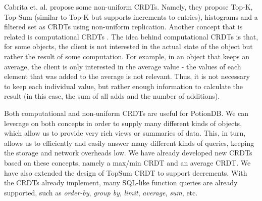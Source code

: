 Cabrita et. al. \cite{nonUniform, nonUniformThesis} propose some non-uniform CRDTs.
Namely, they propose Top-K, Top-Sum (similar to Top-K but supports increments to entries), histograms and a filtered set as CRDTs using non-uniform replication.
Another concept that is related is computational CRDTs \cite{computationalCrdt}.
The idea behind computational CRDTs is that, for some objects, the client is not interested in the actual state of the object but rather the result of some computation.
For example, in an object that keeps an average, the client is only interested in the average value - the values of each element that was added to the average is not relevant.
Thus, it is not necessary to keep each individual value, but rather enough information to calculate the result (in this case, the sum of all adds and the number of additions).

Both computational and non-uniform CRDTs are useful for PotionDB.
We can leverage on both concepts in order to supply many different kinds of objects, which allow us to provide very rich views or summaries of data. 
This, in turn, allows us to efficiently and easily answer many different kinds of queries, keeping the storage and network overheads low.
We have already developed new CRDTs based on these concepts, namely a max/min CRDT and an average CRDT.
We have also extended the design of TopSum CRDT to support decrements.
With the CRDTs already implement, many SQL-like function queries are already supported, such as \emph{order-by}, \emph{group by}, \emph{limit}, \emph{average}, \emph{sum}, etc.






